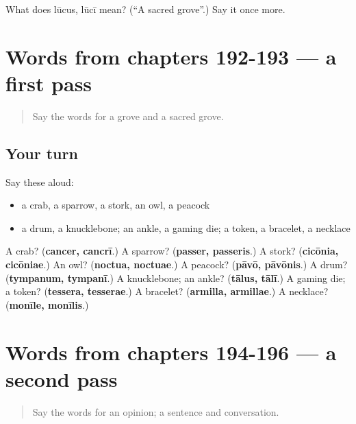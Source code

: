\begin{tcolorbox}[breakable,colback=teal!4,colframe=teal!35!black,title={Before you move on}]
What does lūcus, lūcī mean? (\textquotedblleft{}A sacred grove\textquotedblright{}.) Say it once more.
\end{tcolorbox}
\section[(dialogue)]{Words from chapters 192-193 — a first pass}

\label{lesson:LA-R196-first-pass-words-from-chapters-192-193}



\begin{quote}
Say the words for a grove and a sacred grove.
\end{quote}

\subsection*{Your turn}
Say these aloud:

\begin{itemize}
\raggedright
  \item a crab, a sparrow, a stork, an owl, a peacock
  \item a drum, a knucklebone; an ankle, a gaming die; a token, a bracelet, a necklace
\end{itemize}

\begin{tcolorbox}[breakable,colback=teal!4,colframe=teal!35!black,title={Before you move on}]
A crab? (\textbf{cancer, cancrī}.) A sparrow? (\textbf{passer, passeris}.) A stork? (\textbf{cicōnia, cicōniae}.) An owl? (\textbf{noctua, noctuae}.) A peacock? (\textbf{pāvō, pāvōnis}.) A drum? (\textbf{tympanum, tympanī}.) A knucklebone; an ankle? (\textbf{tālus, tālī}.) A gaming die; a token? (\textbf{tessera, tesserae}.) A bracelet? (\textbf{armilla, armillae}.) A necklace? (\textbf{monīle, monīlis}.)
\end{tcolorbox}
\section[(dialogue)]{Words from chapters 194-196 — a second pass}

\label{lesson:LA-R196-second-pass-words-from-chapters-194-196}



\begin{quote}
Say the words for an opinion; a sentence and conversation.
\end{quote}

